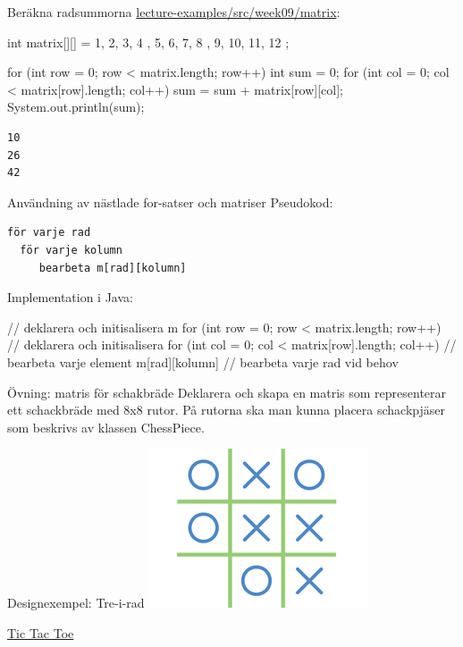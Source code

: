 \documentclass{lecturenotes}
\begin{document}
\begin{Slide}{Beräkna radsummorna}
\footnotesize\href{https://github.com/bjornregnell/lth-eda016-2015/tree/master/lectures/examples/eclipse-ws/lecture-examples/src/week09}{lecture-examples/src/week09/matrix}:
\begin{Code}[numberstyle=,numbers=left]
        int matrix[][] = { { 1, 2, 3, 4 }, { 5, 6, 7, 8 }, {9, 10, 11, 12} };
        
        for (int row = 0; row < matrix.length; row++) {
            int sum = 0;
            for (int col = 0; col < matrix[row].length; col++) {
                sum = sum + matrix[row][col];
            }
            System.out.println(sum);
        }
\end{Code}
\begin{verbatim}
10
26
42
\end{verbatim}
\end{Slide}

\begin{Slide}{Användning av nästlade for-satser och matriser}
Pseudokod:
\begin{verbatim}
för varje rad
  för varje kolumn
     bearbeta m[rad][kolumn]
\end{verbatim}
Implementation i Java:
\begin{Code}
        // deklarera och initisalisera m
        for (int row = 0; row < matrix.length; row++) {
            // deklarera och initisalisera
            for (int col = 0; col < matrix[row].length; col++) {
                 // bearbeta varje element m[rad][kolumn]
            }
           // bearbeta varje rad vid behov
        }
\end{Code}
\end{Slide}

\begin{Slide}{Övning: matris för schakbräde}
Deklarera och skapa en matris som representerar ett schackbräde med 8x8 rutor. På rutorna ska man kunna placera schackpjäser som beskrivs av klassen ChessPiece.
\end{Slide}

\begin{Slide}{Designexempel: Tre-i-rad}
\includegraphics{img/tictactoe}

\href{https://en.wikipedia.org/wiki/Tic-tac-toe}{Tic Tac Toe}
\end{Slide}
\end{document}
